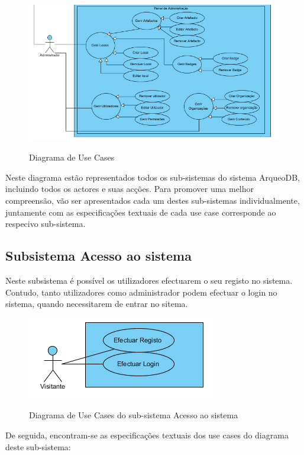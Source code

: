 ﻿\documentclass[12pt,a4paper]{article}
\begin{document}
\begin{figure}[h!]
\centering
\includegraphics[scale=1]{usecase/geral3}
\label{usecase}
\caption{Diagrama de Use Cases}
\end{figure}

\clearpage

Neste diagrama estão representados todos os sub-sistemas do sistema ArqueoDB, incluindo todos os actores e suas acções. Para promover uma  melhor compreensão, vão ser apresentados cada um destes sub-sistemas individualmente, juntamente com as especificações textuais de cada use case corresponde ao respecivo sub-sistema. \\


\subsection{Subsistema Acesso ao sistema}
Neste subsistema é possível os utilizadores efectuarem o seu registo no sistema. Contudo, tanto utilizadores como administrador podem efectuar o login no sistema, quando necessitarem de entrar no sitema.\\

\begin{figure}[h!]
\centering
\includegraphics[scale=1]{usecase/U_AcessoSistema}
\label{usecase}
\caption{Diagrama de Use Cases do sub-sistema Acesso ao sistema}
\end{figure}

De seguida, encontram-se as especificações textuais dos use cases do diagrama deste sub-sistema:\\
\end{document}
